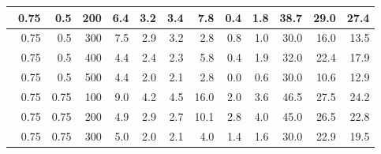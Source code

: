 \begin{longtable}{|r|r|r|r|r|r|r|r|r|r|r|r|}
        \hline \
        0.75                           & 0.5                     & 200                       & 6.4                       & 3.2                       & 3.4                       & 7.8                       & 0.4                       & 1.8                       & 38.7                      & 29.0                      & 27.4                      \\
        \hline \
        0.75                           & 0.5                     & 300                       & 7.5                       & 2.9                       & 3.2                       & 2.8                       & 0.8                       & 1.0                       & 30.0                      & 16.0                      & 13.5                      \\
        \hline \
        0.75                           & 0.5                    & 400                       & 4.4                       & 2.4                       & 2.3                       & 5.8                      & 0.4                       & 1.9                       & 32.0                      & 22.4                      & 17.9                      \\
        \hline \
        0.75                           & 0.5                    & 500                       & 4.4                       & 2.0                       & 2.1                       & 2.8                      & 0.0                       & 0.6                       & 30.0                      & 10.6                      & 12.9                      \\
        \hline \
        0.75                           & 0.75                    & 100                       & 9.0                       & 4.2                       & 4.5                       & 16.0                       & 2.0                       & 3.6                       & 46.5                      & 27.5                      & 24.2                      \\
        \hline \
        0.75                           & 0.75                    & 200                       & 4.9                       & 2.9                       & 2.7                       & 10.1                       & 2.8                       & 4.0                       & 45.0                      & 26.5                      & 22.8                      \\
        \hline \
        0.75                           & 0.75                    & 300                       & 5.0                       & 2.0                       & 2.1                       & 4.0                       & 1.4                       & 1.6                       & 30.0                      & 22.9                      & 19.5                      \\

\end{longtable}
